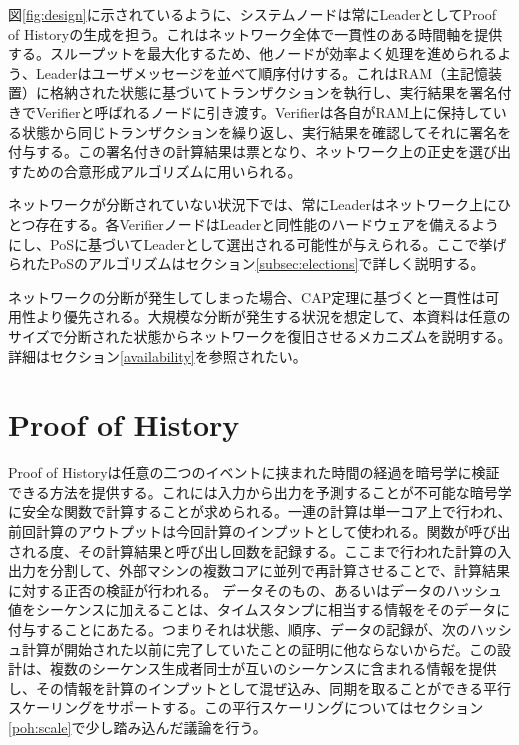 \documentclass[12pt]{ltjsarticle}
\begin{document}
図\ref{fig:design}に示されているように、システムノードは常にLeaderとしてProof of Historyの生成を担う。これはネットワーク全体で一貫性のある時間軸を提供する。スループットを最大化するため、他ノードが効率よく処理を進められるよう、Leaderはユーザメッセージを並べて順序付けする。これはRAM（主記憶装置）に格納された状態に基づいてトランザクションを執行し、実行結果を署名付きでVerifierと呼ばれるノードに引き渡す。Verifierは各自がRAM上に保持している状態から同じトランザクションを繰り返し、実行結果を確認してそれに署名を付与する。この署名付きの計算結果は票となり、ネットワーク上の正史を選び出すための合意形成アルゴリズムに用いられる。

ネットワークが分断されていない状況下では、常にLeaderはネットワーク上にひとつ存在する。各VerifierノードはLeaderと同性能のハードウェアを備えるようにし、PoSに基づいてLeaderとして選出される可能性が与えられる。ここで挙げられたPoSのアルゴリズムはセクション\ref{subsec:elections}で詳しく説明する。

ネットワークの分断が発生してしまった場合、CAP定理に基づくと一貫性は可用性より優先される。大規模な分断が発生する状況を想定して、本資料は任意のサイズで分断された状態からネットワークを復旧させるメカニズムを説明する。詳細はセクション\ref{availability}を参照されたい。

\section{Proof of History}\label{proof_of_history}

Proof of Historyは任意の二つのイベントに挟まれた時間の経過を暗号学に検証できる方法を提供する。これには入力から出力を予測することが不可能な暗号学に安全な関数で計算することが求められる。一連の計算は単一コア上で行われ、前回計算のアウトプットは今回計算のインプットとして使われる。関数が呼び出される度、その計算結果と呼び出し回数を記録する。ここまで行われた計算の入出力を分割して、外部マシンの複数コアに並列で再計算させることで、計算結果に対する正否の検証が行われる。
データそのもの、あるいはデータのハッシュ値をシーケンスに加えることは、タイムスタンプに相当する情報をそのデータに付与することにあたる。つまりそれは状態、順序、データの記録が、次のハッシュ計算が開始された以前に完了していたことの証明に他ならないからだ。この設計は、複数のシーケンス生成者同士が互いのシーケンスに含まれる情報を提供し、その情報を計算のインプットとして混ぜ込み、同期を取ることができる平行スケーリングをサポートする。この平行スケーリングについてはセクション\ref{poh:scale}で少し踏み込んだ議論を行う。
\end{document}
